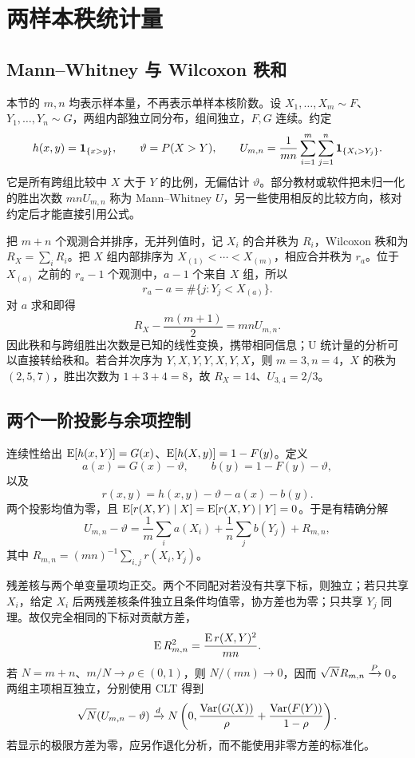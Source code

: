 \section{两样本秩统计量}

\subsection{Mann--Whitney 与 Wilcoxon 秩和}

本节的 $m,n$ 均表示样本量，不再表示单样本核阶数。设 $X_1,\ldots,X_m\sim F$、$Y_1,\ldots,Y_n\sim G$，两组内部独立同分布，组间独立，$F,G$ 连续。约定
\[
 h(x,y)=\mathbf 1_{\{x>y\}},\qquad
 \vartheta=P(X>Y),\qquad
 U_{m,n}=\frac1{mn}\sum_{i=1}^m\sum_{j=1}^n\mathbf 1_{\{X_i>Y_j\}}.
\]
它是所有跨组比较中 $X$ 大于 $Y$ 的比例，无偏估计 $\vartheta$。部分教材或软件把未归一化的胜出次数 $mnU_{m,n}$ 称为 Mann--Whitney $U$，另一些使用相反的比较方向，核对约定后才能直接引用公式。

把 $m+n$ 个观测合并排序，无并列值时，记 $X_i$ 的合并秩为 $R_i$，Wilcoxon 秩和为 $R_X=\sum_iR_i$。把 $X$ 组内部排序为 $X_{(1)}<\cdots<X_{(m)}$，相应合并秩为 $r_a$。位于 $X_{(a)}$ 之前的 $r_a-1$ 个观测中，$a-1$ 个来自 $X$ 组，所以
\[
 r_a-a=\#\{j:Y_j<X_{(a)}\}.
\]
对 $a$ 求和即得
\begin{equation}
 R_X-\frac{m(m+1)}2=mnU_{m,n}.
 \label{eq:ch4-rank-equivalence}
\end{equation}
因此秩和与跨组胜出次数是已知的线性变换，携带相同信息；U 统计量的分析可以直接转给秩和。若合并次序为 $Y,X,Y,Y,X,Y,X$，则 $m=3,n=4$，$X$ 的秩为 $(2,5,7)$，胜出次数为 $1+3+4=8$，故 $R_X=14$、$U_{3,4}=2/3$。

\subsection{两个一阶投影与余项控制}

连续性给出 $\operatorname{E}[h(x,Y)]=G(x)$、$\operatorname{E}[h(X,y)]=1-F(y)$。定义
\[
 a(x)=G(x)-\vartheta,\qquad
 b(y)=1-F(y)-\vartheta,
\]
以及
\[
 r(x,y)=h(x,y)-\vartheta-a(x)-b(y).
\]
两个投影均值为零，且 $\operatorname{E}[r(X,Y)\mid X]=\operatorname{E}[r(X,Y)\mid Y]=0$。于是有精确分解
\begin{equation}
 U_{m,n}-\vartheta
 =\frac1m\sum_i a(X_i)+\frac1n\sum_j b(Y_j)+R_{m,n},
 \label{eq:ch4-twosample-projection}
\end{equation}
其中 $R_{m,n}=(mn)^{-1}\sum_{i,j}r(X_i,Y_j)$。

残差核与两个单变量项均正交。两个不同配对若没有共享下标，则独立；若只共享 $X_i$，给定 $X_i$ 后两残差核条件独立且条件均值零，协方差也为零；只共享 $Y_j$ 同理。故仅完全相同的下标对贡献方差，
\[
 \operatorname{E} R_{m,n}^2=\frac{\operatorname{E} r(X,Y)^2}{mn}.
\]
若 $N=m+n$、$m/N\to\rho\in(0,1)$，则 $N/(mn)\to0$，因而 $\sqrt N R_{m,n}\xrightarrow{P}0$。两组主项相互独立，分别使用 CLT 得到
\[
 \sqrt N(U_{m,n}-\vartheta)\xrightarrow{d}
 N\left(0,\frac{\operatorname{Var}(G(X))}{\rho}
          +\frac{\operatorname{Var}(F(Y))}{1-\rho}\right).
\]
若显示的极限方差为零，应另作退化分析，而不能使用非零方差的标准化。

